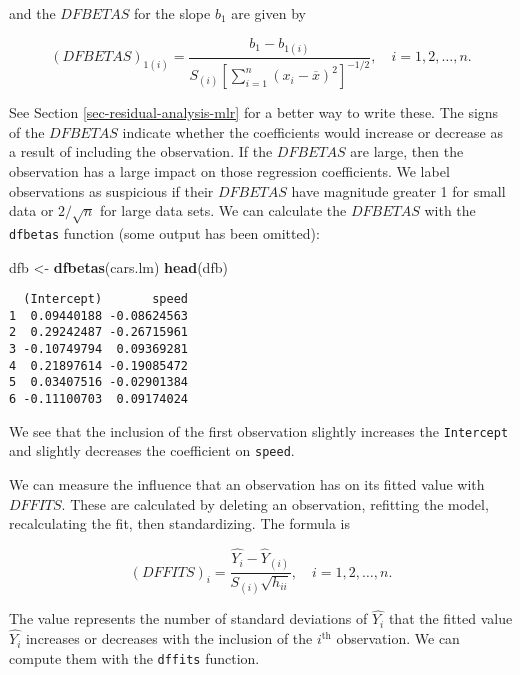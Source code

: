 \documentclass[]{book}
\newenvironment{Shaded}{\begin{snugshade}}{\end{snugshade}}
\newcommand{\KeywordTok}[1]{\textcolor[rgb]{0.13,0.29,0.53}{\textbf{{#1}}}}
\newcommand{\StringTok}[1]{\textcolor[rgb]{0.31,0.60,0.02}{{#1}}}
\newcommand{\NormalTok}[1]{{#1}}
\numberwithin{equation}{chapter}
\numberwithin{figure}{chapter}
\theoremstyle{plain}
\theoremstyle{definition}
\theoremstyle{remark}
\theoremstyle{definition}
\theoremstyle{definition}
\theoremstyle{remark}
\begin{document}
and the \(DFBETAS\) for the slope \(b_{1}\) are given by

\begin{equation}
(DFBETAS)_{1(i)}=\frac{b_{1}-b_{1(i)}}{S_{(i)}\left[\sum_{i=1}^{n}(x_{i}-\overline{x})^{2}\right]^{-1/2}},\quad i=1,2,\ldots,n.
\end{equation}

See Section \ref{sec-residual-analysis-mlr} for a better way to write
these. The signs of the \(DFBETAS\) indicate whether the coefficients
would increase or decrease as a result of including the observation. If
the \(DFBETAS\) are large, then the observation has a large impact on
those regression coefficients. We label observations as suspicious if
their \(DFBETAS\) have magnitude greater 1 for small data or
\(2/\sqrt{n}\) for large data sets. We can calculate the \(DFBETAS\)
with the \texttt{dfbetas} function (some output has been omitted):

\begin{Shaded}
\begin{Highlighting}[]
\NormalTok{dfb <-}\StringTok{ }\KeywordTok{dfbetas}\NormalTok{(cars.lm)}
\KeywordTok{head}\NormalTok{(dfb)}
\end{Highlighting}
\end{Shaded}

\begin{verbatim}
  (Intercept)       speed
1  0.09440188 -0.08624563
2  0.29242487 -0.26715961
3 -0.10749794  0.09369281
4  0.21897614 -0.19085472
5  0.03407516 -0.02901384
6 -0.11100703  0.09174024
\end{verbatim}

We see that the inclusion of the first observation slightly increases
the \texttt{Intercept} and slightly decreases the coefficient on
\texttt{speed}.

We can measure the influence that an observation has on its fitted value
with \(DFFITS\). These are calculated by deleting an observation,
refitting the model, recalculating the fit, then standardizing. The
formula is

\begin{equation}
(DFFITS)_{i}=\frac{\hat{Y_{i}}-\hat{Y}_{(i)}}{S_{(i)}\sqrt{h_{ii}}},\quad i=1,2,\ldots,n.
\end{equation}

The value represents the number of standard deviations of
\(\hat{Y_{i}}\) that the fitted value \(\hat{Y_{i}}\) increases or
decreases with the inclusion of the \(i^{\textrm{th}}\) observation. We
can compute them with the \texttt{dffits} function.
\end{document}
